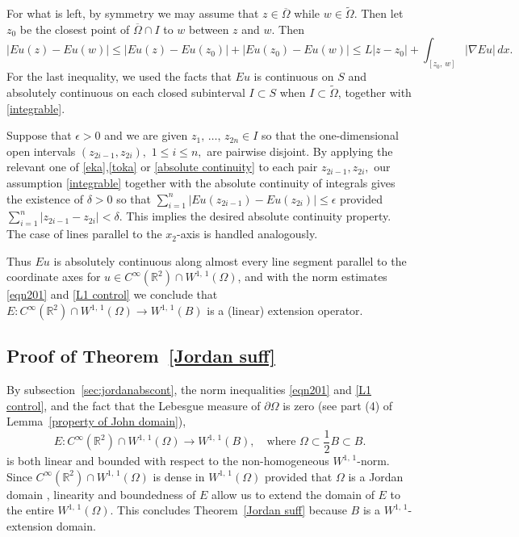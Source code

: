 \documentclass[reqno,11pt]{amsart}
\def\ez{\epsilon}
\def\wz{\widetilde}
\numberwithin{equation}{section}
\theoremstyle{remark}
\begin{document}
For what is left, by symmetry we may assume that $z\in \overline{\Omega}$ 
while $w\in \wz \Omega$. Then let $z_0$ be the closest point of 
$\overline{\Omega}\cap I$ to $w$ between $z$ and $w.$ Then 
\begin{equation}\label{absolute continuity}
|Eu(z)-Eu(w)|\le |Eu(z)-Eu(z_0)|+|Eu(z_0)-Eu(w)| \le  
L|z-z_0|+\int_{[z_0,\,w]} |\nabla Eu|\, dx.
\end{equation}
For the last inequality, we used the facts that $Eu$ is continuous on $S$ 
and absolutely continuous on each closed subinterval $I\subset S$ when 
$I\subset \wz \Omega$, together with \eqref{integrable}.


Suppose that $\ez>0$ and we are given $z_1,\,\dots,\,z_{2n}\in I$ so that 
the one-dimensional
open intervals $(z_{2i-1},z_{2i}),$ $1\le i\le n,$ are pairwise disjoint. By
applying the relevant one of \eqref{eka},\eqref{toka} or
\eqref{absolute continuity} to each pair $z_{2i-1},z_{2i},$ our assumption 
\eqref{integrable} together with the absolute continuity of integrals
gives the existence of  $\delta>0$ so that 
 $\sum_{i=1}^{n} |Eu(z_{2i-1})-Eu(z_{2i})|\le \ez$ provided
 $\sum_{i=1}^{n} |z_{2i-1}-z_{2i}|<\delta.$ This implies the desired absolute
continuity property. The case of lines parallel to the $x_2$-axis is handled analogously.  


Thus $Eu$ is absolutely continuous along almost every line segment parallel to the 
coordinate axes for $u\in C^{\infty}(\mathbb R^2)\cap W^{1,\,1}(\Omega)$, and with the norm estimates \eqref{eqn201} and \eqref{L1 control} we conclude that $E\colon C^{\infty}(\mathbb R^2)\cap W^{1,\,1}(\Omega) \to   W^{1,\,1}(B)$ is a (linear) extension operator. 

\subsection{Proof of Theorem~\ref{Jordan suff}}
By subsection~\ref{sec:jordanabscont}, the norm inequalities \eqref{eqn201} and \eqref{L1 control}, and the fact that the Lebesgue measure of $\partial \Omega$ is zero (see part (4) of Lemma~\ref{property of John domain}),
$$E\colon C^{\infty}(\mathbb R^2)\cap W^{1,\,1}(\Omega) \to   W^{1,\,1}(B), \quad  \text{where $\Omega\subset \frac{1}{2}B\subset B$}.$$
 is both linear and bounded with respect to the non-homogeneous $W^{1,\,1}$-norm. Since    $C^{\infty}(\mathbb R^2)\cap W^{1,\,1}(\Omega)$ is dense 
in $W^{1,\,1}(\Omega)$ 
provided that $\Omega$ is a Jordan domain  \cite{KZ2015}, 
linearity and boundedness of $E$ allow us to extend the domain of $E$ 
to the entire $W^{1,\,1}(\Omega)$.  This concludes Theorem~\ref{Jordan suff} because $B$  is a $W^{1,\,1}$-extension domain.
\end{document}
